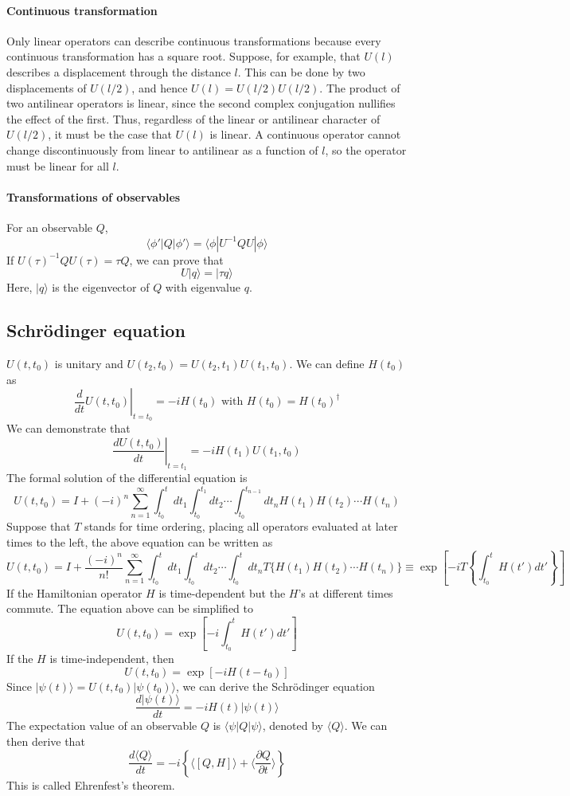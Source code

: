 \documentclass{article}
\begin{document}
\paragraph{Continuous transformation} Only linear operators can describe continuous transformations because every continuous transformation has a square root. Suppose, for example, that $U(l)$ describes a displacement through the distance $l$. This can be done by two displacements of $U(l/2)$, and hence $U(l) = U(l/2) U(l/2)$. The product of two antilinear operators is linear, since the second complex conjugation nullifies the effect of the first. Thus, regardless of the linear or antilinear character of $U(l/2)$, it must be the case that $U(l)$ is linear. A continuous operator cannot change discontinuously from linear to antilinear as a function of $l$, so the operator must be linear for all $l$.
\paragraph{Transformations of observables}
For an observable $Q$, 
\[\langle \phi' | Q | \phi' \rangle = \langle \phi | U^{-1}QU | \phi \rangle \]
If $U(\tau)^{-1}QU(\tau) = \tau Q$, we can prove that
\[U|q\rangle = |\tau q\rangle\]
Here, $|q\rangle$ is the eigenvector of $Q$ with eigenvalue $q$. 


\subsection{Schr\"{o}dinger equation}
$U(t,t_0)$ is unitary and $U(t_2,t_0) = U(t_2,t_1)U(t_1,t_0)$. We can define $H(t_0)$ as
\[\left. \frac{d}{dt}U(t,t_0)\right|_{t=t_0} = -iH(t_0) \mbox{ with } H(t_0) = H(t_0)^{\dagger}\]
We can demonstrate that
\[\left. \frac{dU(t,t_0)}{dt}\right|_{t=t_1} = -iH(t_1)U(t_1,t_0) \]
The formal solution of the differential equation is
\[U(t,t_0) = I + (-i)^n \sum_{n=1}^{\infty} \int_{t_0}^{t}dt_1 \int_{t_0}^{t_1}dt_2 \cdots \int_{t_0}^{t_{n-1}} dt_n H(t_1)H(t_2)\cdots H(t_n)\]
Suppose that $T$ stands for time ordering, placing all operators evaluated at later times to the left, the above equation can be written as
\[U(t,t_0) = I + \frac{(-i)^n}{n!} \sum_{n=1}^{\infty} \int_{t_0}^{t}dt_1 \int_{t_0}^{t}dt_2 \cdots \int_{t_0}^{t} dt_n T\{H(t_1)H(t_2)\cdots H(t_n)\} \equiv \exp \left[ -i T\left\{ \int_{t_0}^{t} H(t')dt'\right\} \right] \]
If the Hamiltonian operator $H$ is time-dependent but the $H$'s at different times commute. The equation above can be simplified to
\[U(t,t_0) = \exp \left[ -i \int_{t_0}^{t} H(t')dt' \right] \]
If the $H$ is time-independent, then
\[U(t,t_0) = \exp \left[ -i H(t-t_0) \right] \]
Since $|\psi(t)\rangle = U(t,t_0) |\psi(t_0)\rangle$, we can derive the Schr\"{o}dinger equation
\[\frac{d |\psi(t)\rangle}{dt} = -iH(t) |\psi(t)\rangle\]
The expectation value of an observable $Q$ is $\langle \psi | Q | \psi \rangle$, denoted by $\langle Q \rangle$. We can then derive that
\[\frac{d\langle Q \rangle}{dt} = -i \left\{ \langle [Q,H] \rangle + \langle \frac{\partial Q}{\partial t} \rangle \right\}\]
This is called Ehrenfest's theorem. 
\end{document}
